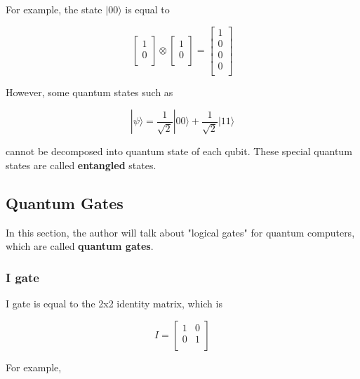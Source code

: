   For example, the state $|00\rangle$ is equal to 
  
\begin{equation}
 \left[
\begin{array}{c}
1 \\
0 \\
\end{array}
\right]
\otimes
 \left[
\begin{array}{c}
1 \\
0 \\
\end{array}
\right]
= \left[
\begin{array}{c}
1 \\
0 \\
0 \\
0 \\
\end{array}
\right]
\end{equation}

 However, some quantum states such as
 
 \begin{equation}
 	|\psi\rangle = \frac{1}{\sqrt{2}}|00\rangle + \frac{1}{\sqrt{2}}|11\rangle
 \end{equation}
 
 cannot be decomposed into quantum state of each qubit.  These special quantum states are called \textbf{entangled} states.

\subsection{Quantum Gates}

 In this section, the author will talk about "logical gates" for quantum computers, which are called \textbf{quantum gates}.
 
\subsubsection{I gate}

I gate is equal to the 2x2 identity matrix, which is 

\begin{equation}
I = \begin{bmatrix}
1 & 0 \\
0 & 1 \\
\end{bmatrix}
\end{equation}

For example,


